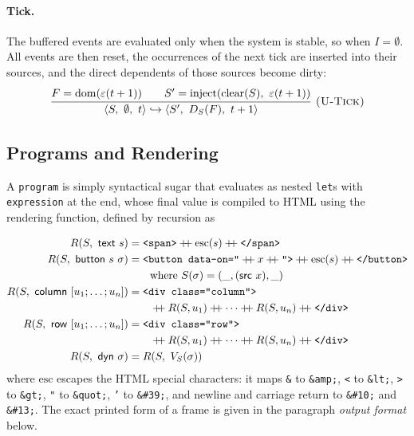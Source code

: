 \documentclass{article}
\makeatletter
\newcommand{\kw}[1]{\mathsf{#1}}
\newcommand{\cfg}[3]{\langle #1,\ #2,\ #3\rangle}
\newcommand{\ustep}{\hookrightarrow}
\newcommand{\cat}{\mathbin{+\!\!+}}
\newcommand{\rul}[3]{\[\dfrac{\begin{array}{@{}c@{}}#2\end{array}}{\begin{array}{@{}c@{}}#3\end{array}}\ \textsc{#1}\]}
\makeatother
\begin{document}
\paragraph{Tick.}
The buffered events are evaluated only when the system is stable, so when $I = \emptyset$. All events are then reset, the occurrences of the next tick are inserted into their sources, and the direct dependents of those sources become dirty:
\rul{(U-Tick)}{F = \mathrm{dom}(\varepsilon(t+1)) \qquad S' = \mathrm{inject}(\mathrm{clear}(S),\ \varepsilon(t+1))}
{\cfg{S}{\emptyset}{t} \ustep \cfg{S'}{D_S(F)}{t+1}}

\subsection{Programs and Rendering}\label{sec:prog}

A \texttt{program} is simply syntactical sugar that evaluates as nested \texttt{let}s with \texttt{expression} at the end, whose final value is compiled to HTML using the rendering function, defined by recursion as


\begin{align*}
R(S,\ \kw{text}\ s) &= \texttt{\textless span\textgreater}\cat \mathrm{esc}(s) \cat \texttt{\textless /span\textgreater}\\
R(S,\ \kw{button}\ s\ \sigma) &= \texttt{\textless button data-on="}\cat x \cat \texttt{"\textgreater}\cat \mathrm{esc}(s) \cat \texttt{\textless /button\textgreater}\\ &\qquad\text{where } S(\sigma) = (\_,(\kw{src}\ x),\_)\\
R(S,\ \kw{column}\ [u_1;\dots;u_n]) &= \texttt{\textless div class="column"\textgreater}\\ &\qquad\cat R(S,u_1) \cat \cdots \cat R(S,u_n) \cat \texttt{\textless /div\textgreater}\\
R(S,\ \kw{row}\ [u_1;\dots;u_n]) &= \texttt{\textless div class="row"\textgreater}\\ &\qquad\cat R(S,u_1) \cat \cdots \cat R(S,u_n) \cat \texttt{\textless /div\textgreater}\\
R(S,\ \kw{dyn}\ \sigma) &= R(S,\ V_S(\sigma))
\end{align*}
where $\mathrm{esc}$ escapes the HTML special characters: it maps \texttt{\&} to \texttt{\&amp;}, \texttt{\textless} to \texttt{\&lt;}, \texttt{\textgreater} to \texttt{\&gt;}, \texttt{"} to \texttt{\&quot;}, \texttt{'} to \texttt{\&\#39;}, and newline and carriage return to \texttt{\&\#10;} and \texttt{\&\#13;}. The exact printed form of a frame is given in the paragraph \emph{output format} below.
\end{document}
